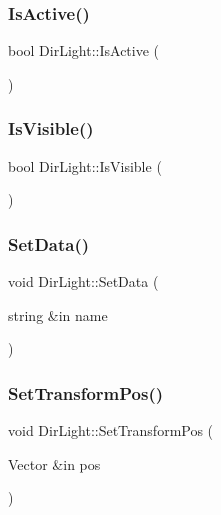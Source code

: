 \hypertarget{class_dir_light_a3cb7c83bccdd1330b8044a1bff736142}{}\label{class_dir_light_a3cb7c83bccdd1330b8044a1bff736142} 
\subsubsection{\texorpdfstring{Is\+Active()}{IsActive()}}
{\footnotesize\ttfamily bool Dir\+Light\+::\+Is\+Active (\begin{DoxyParamCaption}{ }\end{DoxyParamCaption})}

\hypertarget{class_dir_light_a1ef7dc819ad78357285605b9c2e09557}{}\label{class_dir_light_a1ef7dc819ad78357285605b9c2e09557} 
\subsubsection{\texorpdfstring{Is\+Visible()}{IsVisible()}}
{\footnotesize\ttfamily bool Dir\+Light\+::\+Is\+Visible (\begin{DoxyParamCaption}{ }\end{DoxyParamCaption})}

\hypertarget{class_dir_light_a9a81f22cc9a43752bf6101ca6a202faf}{}\label{class_dir_light_a9a81f22cc9a43752bf6101ca6a202faf} 
\subsubsection{\texorpdfstring{Set\+Data()}{SetData()}}
{\footnotesize\ttfamily void Dir\+Light\+::\+Set\+Data (\begin{DoxyParamCaption}\item[{string \&in}]{name }\end{DoxyParamCaption})}

\hypertarget{class_dir_light_a81f5f88a06ca2991ad71fc8f68890932}{}\label{class_dir_light_a81f5f88a06ca2991ad71fc8f68890932} 
\subsubsection{\texorpdfstring{Set\+Transform\+Pos()}{SetTransformPos()}}
{\footnotesize\ttfamily void Dir\+Light\+::\+Set\+Transform\+Pos (\begin{DoxyParamCaption}\item[{Vector \&in}]{pos }\end{DoxyParamCaption})}


